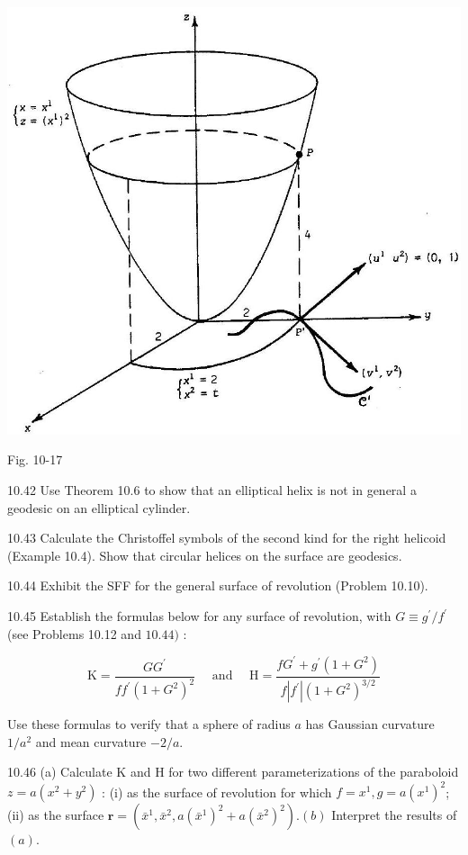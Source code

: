 \documentclass[10pt]{article}
\begin{document}
\begin{center}
\includegraphics[max width=\textwidth]{2024_04_03_41f90be4f896e21f0dc9g-161}
\end{center}

Fig. 10-17

10.42 Use Theorem 10.6 to show that an elliptical helix is not in general a geodesic on an elliptical cylinder.

10.43 Calculate the Christoffel symbols of the second kind for the right helicoid (Example 10.4). Show that circular helices on the surface are geodesics.

10.44 Exhibit the SFF for the general surface of revolution (Problem 10.10).

10.45 Establish the formulas below for any surface of revolution, with $G \equiv g^{\prime} / f^{\prime}$ (see Problems 10.12 and $10.44)$ :

$$
\mathrm{K}=\frac{G G^{\prime}}{f f^{\prime}\left(1+G^{2}\right)^{2}} \quad \text { and } \quad \mathrm{H}=\frac{f G^{\prime}+g^{\prime}\left(1+G^{2}\right)}{f\left|f^{\prime}\right|\left(1+G^{2}\right)^{3 / 2}}
$$

Use these formulas to verify that a sphere of radius $a$ has Gaussian curvature $1 / a^{2}$ and mean curvature $-2 / a$.

10.46 (a) Calculate $\mathrm{K}$ and $\mathrm{H}$ for two different parameterizations of the paraboloid $z=a\left(x^{2}+y^{2}\right)$ : (i) as the surface of revolution for which $f=x^{1}, g=a\left(x^{1}\right)^{2}$; (ii) as the surface $\mathbf{r}=\left(\bar{x}^{1}, \bar{x}^{2}, a\left(\bar{x}^{1}\right)^{2}+a\left(\bar{x}^{2}\right)^{2}\right) .(b)$ Interpret the results of $(a)$.
\end{document}

